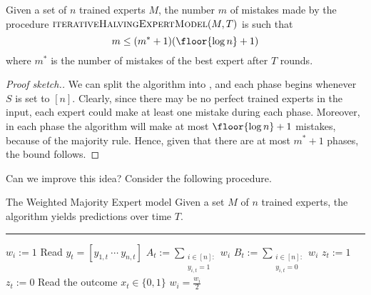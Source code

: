 \documentclass[a4paper, 12pt]{report}
\begin{document}
    \begin{framedthm}{}
        Given a set of $n$ trained experts $M$, the number $m$ of mistakes made by the procedure $\textsc{iterativeHalvingExpertModel}(M, T)$ is such that $$m \le (m^* + 1)(\floor{\log n} + 1)$$ where $m^*$ is the number of mistakes of the best expert after $T$ rounds.
    \end{framedthm}
    
    \begin{proof}[Proof sketch.]
        We can split the algorithm into , and each phase begins whenever $S$ is set to $[n]$. Clearly, since there may be no perfect trained experts in the input, each expert could make at least one mistake during each phase. Moreover, in each phase the algorithm will make at most $\floor{\log n} + 1$ mistakes, because of the majority rule. Hence, given that there are at most $m^* + 1$ phases, the bound follows.
    \end{proof}

    Can we improve this idea? Consider the following procedure.

    \begin{framedalgo}[label={wmem}]{The Weighted Majority Expert model}
        Given a set $M$ of $n$ trained experts, the algorithm yields predictions over time $T$. \\
        \hrule

        \quad
        \begin{algorithmic}[1]
                    \State $w_i := 1$
                \EndFor
                    \State Read $y_t = [y_{1, t} \ \cdots \ y_{n, t}]$
                    \State $A_t := \sum\limits_{\substack{i \in [n] : \\ y_{i , t} = 1}}{w_i}$
                    \State $B_t := \sum\limits_{\substack{i \in [n] : \\ y_{i , t} = 0}}{w_i}$
                        \State $z_t := 1$
                    \Else
                        \State $z_t := 0$
                    \EndIf
                    \State Read the outcome $x_t \in \{0, 1\}$
                                \State $w_i = \tfrac{w_i}{2}$
                            \EndIf
                        \EndFor
                    \EndIf
                \EndFor
            \EndFunction
        \end{algorithmic}
    \end{framedalgo}
    
\end{document}
